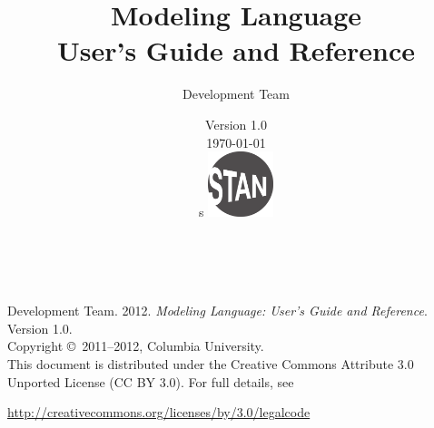 \title{\Huge\bf \Stan Modeling Language \\[4pt] {\LARGE User's Guide and Reference}}
\author{\Stan Development Team}
\date{\vspace*{36pt} \Stan Version 1.0 \\[4pt] {\small \today}
\\s
\vfill
\includegraphics[width=0.75in]{../../../logos/stanlogo-main.pdf}}

\maketitle

\newpage
\thispagestyle{empty}
\mbox{ }
\vfill
\begin{center}
\begin{minipage}[t]{0.75\textwidth}
\small
\Stan Development Team. 2012.  
{\it \Stan Modeling Language: User's Guide and Reference}. Version
1.0.  
\vspace*{20pt}
\mbox{ }
\\
Copyright \copyright \ 2011--2012, Columbia University.
\vspace*{28pt}
\mbox{} \\
This document is distributed under the Creative Commons Attribute 3.0
Unported License (CC BY 3.0).  For full details, see
\begin{center}
\url{http://creativecommons.org/licenses/by/3.0/legalcode} 
\end{center}
\end{minipage}
\vspace*{24pt}
\mbox{ }
\end{center}
